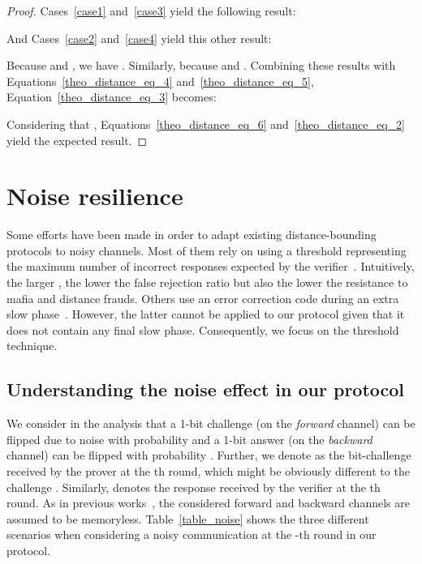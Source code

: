 \documentclass{llncs}
\begin{document}
\begin{proof}
Cases~\ref{case1} and~\ref{case3} yield  the following result: 



And Cases~\ref{case2} and~\ref{case4} yield this other result: 




\noindent Because  and , we have . Similarly,  because  and . Combining these 
results with Equations~\ref{theo_distance_eq_4} and~\ref{theo_distance_eq_5}, 
Equation~\ref{theo_distance_eq_3} becomes:



\noindent Considering that , Equations~\ref{theo_distance_eq_6} 
and~\ref{theo_distance_eq_2} yield the expected result. 

\end{proof}

\section{Noise resilience}\label{section:noise}

Some efforts have been made in order to adapt existing distance-bounding 
protocols to noisy channels. Most of them rely on using a threshold  
representing the maximum number of incorrect responses expected by the 
verifier~\cite{Hancke:2005:RDB:1128018.1128472,KimA-2011-ieeetwc}.
 Intuitively, the larger , the lower the false rejection ratio but also the 
lower the resistance to mafia and distance frauds. Others use an error 
correction code during an extra slow 
phase~\cite{Singelee:2007:DBN:1784404.1784415}. However, the latter cannot be 
applied to our protocol given that it does not contain any final slow phase. 
Consequently, 
we focus on the threshold technique. 

\subsection{Understanding the noise effect in our protocol}

We consider in the analysis that a 1-bit challenge (on the \emph{forward} 
channel) can be flipped due to noise with probability  and a 1-bit answer 
(on the \emph{backward} channel) can be flipped with probability .  
Further, we denote as  the bit-challenge received by the prover at 
the th round, which might be obviously different to the challenge . 
Similarly,  denotes the response received by the verifier at the 
th round. As in previous works~\cite{Hancke:2005:RDB:1128018.1128472}, the 
considered forward and backward channels are assumed to be memoryless. 
Table~\ref{table_noise} shows the three different scenarios when considering a 
noisy communication at the -th round in our protocol. 
\end{document}
